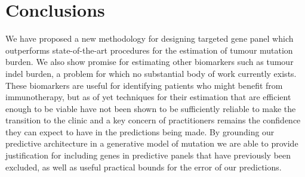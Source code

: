 \documentclass[10pt,twoside,openright]{report}
\begin{document}



\section{Conclusions \label{sec:conclusion}}
 We have proposed a new methodology for designing targeted gene panel which outperforms state-of-the-art procedures for the estimation of tumour mutation burden. We also show promise for estimating other biomarkers such as tumour indel burden, a problem for which no substantial body of work currently exists. These biomarkers are useful for identifying patients who might benefit from immunotherapy, but as of yet techniques for their estimation that are efficient enough to be viable have not been shown to be sufficiently reliable to make the transition to the clinic and a key concern of practitioners remains the confidence they can expect to have in the predictions being made. By grounding our predictive architecture in a generative model of mutation we are able to provide justification for including genes in predictive panels that have previously been excluded, as well as useful practical bounds for the error of our predictions. 
 
\end{document}
